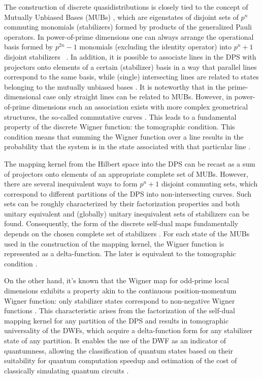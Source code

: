 \documentclass[quantumrep,article,submit,pdftex,moreauthors]{Definitions/mdpi}
\begin{document}
The construction of discrete quasidistributions is closely tied to the concept
of Mutually Unbiased Bases (MUBs) \cite{ivanovic,mubs1,mubs2}, which are
eigenstates of disjoint sets of $p^{n}$ commuting monomials (stabilizers) formed
by products of the generalized Pauli operators. In power-of-prime dimensions one
can always arrange the operational basis formed by $p^{2n}-1$ monomials
(excluding the identity operator) into $p^{n}+1$ disjoint stabilizers
~\cite{Bandyopadhyay2002}. {\color{teal}In addition, it is possible to
associate lines in the DPS with projectors onto elements of a certain
(stabilizer) basis in a way that parallel lines correspond to the same basis,
while (single) intersecting lines are related to states belonging to the
mutually unbiased bases} \cite{wootters1}. It is noteworthy that in the
prime-dimensional case only straight lines can be related to MUBs.  However, in
power-of-prime dimensions such an association exists with more complex
geometrical structures, the so-called commutative curves \cite{GS2,JPA09}. This
leads to a fundamental property of the discrete Wigner function: the tomographic
condition. This condition means that summing the Wigner function over a line
results in the probability that the system is in the state associated with that
particular line \cite{wootters1, gibbons}.

The mapping kernel from the Hilbert space into the DPS can be recast as a sum of
projectors onto elements of an appropriate complete set of MUBs.  However, there
are several inequivalent ways to form $p^{n}+1$ disjoint commuting sets, which
correspond to different partitions of the DPS into non-intersecting curves. Such
sets can be roughly characterized by their factorization properties and both
unitary equivalent and (globally) unitary inequivalent sets of stabilizers can
be found. Consequently, the form of the discrete self-dual maps fundamentally
depends on the chosen complete set of stabilizers \cite{Bjork2007}. For each
state of the MUBs used in the construction of the mapping kernel, the Wigner
function is represented as a delta-function. The later is equivalent to the
tomographic condition \cite{gibbons,galvao,cormick,DFW11,DFW12}.

On the other hand, it's known that the Wigner map for odd-prime local dimensions
exhibits a property akin to the continuous position-momentum Wigner function:
only stabilizer states correspond to non-negative Wigner functions \cite{gross}.
This characteristic arises from the factorization of the self-dual mapping
kernel for any partition of the DPS and results in tomographic universality of
the DWFs, which acquire a delta-function form for any stabilizer state of any
partition. It enables the use of the DWF as an indicator of quantumness,
allowing the classification of quantum states based on their suitability for
quantum computation speedup and estimation of the cost of classically simulating
quantum circuits \cite{Raus17,UniqueWF, cohomo, contextMagic, WignerContext}.
\end{document}
